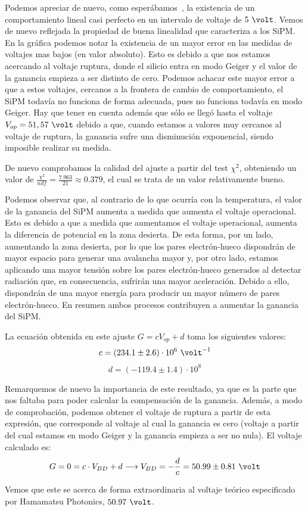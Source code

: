 \begin{itemize}
Podemos apreciar de nuevo, como esperábamos~\cite{tesisSiPM}, la existencia de un comportamiento  lineal casi perfecto en un intervalo de voltaje de $5~\volt$. Vemos de nuevo reflejada la propiedad de buena linealidad que caracteriza a los SiPM. En la gráfica podemos notar la existencia de un mayor error en las medidas de voltajes mas bajos (en valor absoluto). Esto es debido a que nos estamos acercando al voltaje ruptura, donde el silicio entra en modo Geiger y el valor de la ganancia empieza a ser distinto de cero. Podemos achacar este mayor error a que a estos voltajes, cercanos a la frontera de cambio de comportamiento, el SiPM todavía no funciona de forma adecuada,  pues no funciona todavía en  modo Geiger. Hay que tener en cuenta además que sólo se llegó hasta el voltaje $V_{op}=51,57~\volt$  debido a que, cuando estamos a valores muy cercanos al voltaje de ruptura,  la ganancia sufre una disminución exponencial, siendo imposible realizar su medida.

De nuevo comprobamos la calidad del ajuste a partir del test $\chi^2$, obteniendo un valor de $\frac{\chi^2}{ndf}=\frac{7.963}{21}\approx 0.379$, el cual se trata de un valor relativamente bueno.

Podemos observar que, al contrario de lo que ocurría con la temperatura, el valor de la ganancia del SiPM aumenta a medida que aumenta el voltaje operacional. Esto es debido a que a medida que aumentamos el voltaje operacional, aumenta la diferencia de potencial en la zona desierta. De esta forma, por un lado, aumentando la zona desierta, por lo que los pares electrón-hueco dispondrán de mayor espacio para generar una avalancha mayor  y, por otro lado, estamos aplicando una mayor tensión sobre los pares electrón-hueco generados al detectar radiación que,  en consecuencia, sufrirán una mayor aceleración. Debido a ello, dispondrán de una mayor energía para producir un mayor número de pares electrón-hueco. En resumen ambos procesos contribuyen a aumentar la ganancia del SiPM.

La ecuación obtenida en este ajuste $G=cV_{op}+d$ toma los siguientes valores: 
\begin{equation}
c=(234.1 \pm 2.6) \cdot 10^6~\volt^{-1}
\label{ajustependientevoltaje}
\end{equation}
\begin{equation}
d=(-119.4 \pm 1.4) \cdot 10^8
\label{ajusteordenadavoltaje}
\end{equation}

Remarquemos de nuevo la importancia de este resultado, ya que es la parte que nos faltaba para poder calcular la compensación de la ganancia.
Además, a modo de comprobación, podemos obtener el voltaje de ruptura a partir de esta expresión, que corresponde al voltaje al cual la ganancia es cero (voltaje a partir del cual estamos en modo Geiger y la ganancia empieza a ser no nula). El voltaje calculado es: 
\begin{equation}
G=0=c \cdot V_{BD} +d \longrightarrow V_{BD}=-\frac{d}{c}=50.99 \pm 0.81~\volt
\label{ajustebdv}
\end{equation}

Vemos que este se acerca de forma extraordinaria al voltaje teórico especificado por Hamamatsu Photonics, $50.97~\volt$.
\end{itemize}